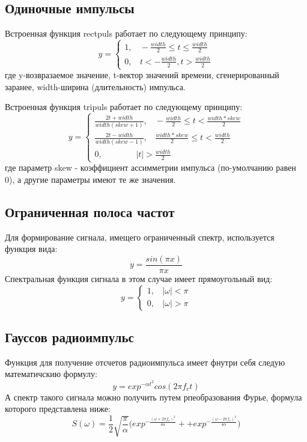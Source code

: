 \subsection{Одиночные импульсы}
Встроенная функция rectpuls работает по следующему принципу:
\begin{equation}
	y = 
	\begin{cases}
		1, \ \ \ \  -\frac{width}{2} \leqslant t \leqslant \frac{width}{2}
  		\\
		0, \ \ \ \ t < -\frac{width}{2}, t > \frac{width}{2}
	\end{cases}
\end{equation}
где y-возвразаемое значение, t-вектор значений времени, сгенерированный заранее, width-ширина (длительность) импульса.

Встроенная функция tripuls работает по следующему принципу:
\begin{equation}
	y =
	\begin{cases}
		\frac{2t+width}{width(skew+1)}, \ \ \ \  -\frac{width}{2} \leqslant t < \frac{width*skew}{2}
		\\
		\frac{2t-width}{width(skew-1)}, \ \ \ \  \frac{width*skew}{2} \leqslant t < \frac{width}{2}
		\\
		0, \ \ \ \ \ \ \ \ \ \ \ \ \ \ \ \ \ \  |t| > \frac{width}{2}
	\end{cases}
\end{equation}
где параметр skew - коэффициент ассимметрии импульса (по-умолчанию равен 0), а другие параметры имеют те же значения.

\subsection{Ограниченная полоса частот}
Для формирование сигнала, имещего ограниченный спектр, используется функция вида:
\begin{equation}
	y = \frac{sin(\pi x)}{\pi x}
\end{equation}
Спектральная функция сигнала в этом случае имеет прямоугольный вид:
\begin{equation}
	y =
	\begin{cases}
		1, \ \ \ \ |\omega| < \pi
		\\
		0, \ \ \ \ |\omega| > \pi
	\end{cases}
\end{equation}

\subsection{Гауссов радиоимпульс}
Функция для получение отсчетов радиоимпульса имеет фнутри себя следую математичскию формулу:
\begin{equation}
	y = exp^{-\alpha t^2} cos(2\pi f_ct)
\end{equation}
А спектр такого сигнала можно получить путем рпеобразования Фурье, формула которого представлена ниже:
\begin{equation}
	S(\omega) = \frac{1}{2} \sqrt{\frac{\pi}{\alpha}} \Bigg( exp^{-\frac{(\omega + 2\pi f_c)^2}{4\alpha}} + + exp^{-\frac{(\omega - 2\pi f_c)^2}{4\alpha}}  \Bigg)
\end{equation}

